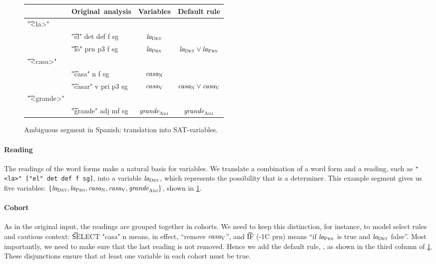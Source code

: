 \begin{figure}[h]
\centering
\begin{tabular}{p{0.6cm} l | c | c }
   & \textbf{Original~analysis} 
                & \textbf{Variables}
                              & \textbf{Default rule} \\ \hline
\t{"<la>"}   &   &            &  {\small {}} \\
  & \t{"el" 
  det def f sg}  & $\text{\em la}_{\text{\sc Det}}$   &  \\
  & \t{"lo" 
  prn p3 f sg}   & $\text{\em la}_{\text{\sc Prn}}$   &   $\text{\em la}_{\text{\sc Det}} \vee \text{\em la}_{\text{\sc Prn}}$ \\
\t{"<casa>"} &   &            &   \\
  & \t{"casa" 
  n f sg}        & $\text{\em casa}_{\text{\sc N}}$   &  \\
  & \t{"casar"
   v pri p3 sg}  & $\text{\em casa}_{\text{\sc V}}$   & $\text{\em casa}_{\text{\sc N}} \vee \text{\em casa}_{\text{\sc V}}$  \\
\t{"<grande>"} & &            & \\
  & \t{"grande" 
  adj mf sg}   & $\text{\em grande}_{\text{\sc Adj}}$ & $\text{\em grande}_{\text{\sc Adj}}$
\end{tabular}
\caption{Ambiguous segment in Spanish: translation into SAT-variables.}
\label{fig:laCasaGrande}
\end{figure}



\paragraph{Reading}
The readings of the word forms make a natural basis for variables.
We translate a combination of a word form and a reading, such as \texttt{"<la>" ["el" det def f sg]}, into a variable $\text{\em la}_{\text{\sc Det}}$, which represents the possibility that \la{} is a determiner. This example segment gives us five variables: $\{ \text{\em la}_{\text{\sc Det}} , \text{\em la}_{\text{\sc Prn}} , \text{\em casa}_{\text{\sc N}} , \text{\em casa}_{\text{\sc V}},  \text{\em grande}_{\text{\sc Adj}} \}$, shown in \ref{fig:laCasaGrande}.

\paragraph{Cohort} As in the original input, the readings are grouped together in cohorts. We need to keep this distinction, for instance, to model {\sc select} rules and cautious context: 
\t{SELECT "casa" n} means, in effect, ``remove $\text{\em casa}_{\text{\sc V}}$'', and \t{IF (-1C prn)} means ``if $\text{\em la}_{\text{\sc Prn}}$ is true and $\text{\em la}_{\text{\sc Det}}$ false''. 
%
Most importantly, we need to make sure that the last reading is not removed. Hence we add the default rule, , as shown in the third column of \ref{fig:laCasaGrande}. 
These disjunctions ensure that at least one variable in each cohort must be true.



